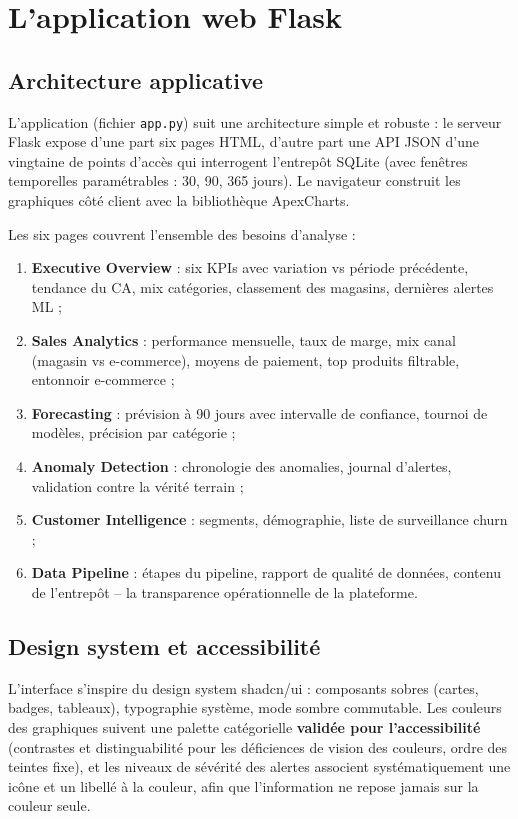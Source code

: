 \documentclass[12pt,a4paper]{report}
\begin{document}
\section{L'application web Flask}

\subsection{Architecture applicative}

L'application (fichier \texttt{app.py}) suit une architecture simple et
robuste : le serveur Flask expose d'une part six pages HTML, d'autre part une
API JSON d'une vingtaine de points d'accès qui interrogent l'entrepôt SQLite
(avec fenêtres temporelles paramétrables : 30, 90, 365 jours). Le navigateur
construit les graphiques côté client avec la bibliothèque ApexCharts.

Les six pages couvrent l'ensemble des besoins d'analyse :
\begin{enumerate}
  \item \textbf{Executive Overview} : six KPIs avec variation vs période
    précédente, tendance du CA, mix catégories, classement des magasins,
    dernières alertes ML ;
  \item \textbf{Sales Analytics} : performance mensuelle, taux de marge, mix
    canal (magasin vs e-commerce), moyens de paiement, top produits filtrable,
    entonnoir e-commerce ;
  \item \textbf{Forecasting} : prévision à 90 jours avec intervalle de
    confiance, tournoi de modèles, précision par catégorie ;
  \item \textbf{Anomaly Detection} : chronologie des anomalies, journal
    d'alertes, validation contre la vérité terrain ;
  \item \textbf{Customer Intelligence} : segments, démographie, liste de
    surveillance churn ;
  \item \textbf{Data Pipeline} : étapes du pipeline, rapport de qualité de
    données, contenu de l'entrepôt -- la transparence opérationnelle de la
    plateforme.
\end{enumerate}

\subsection{Design system et accessibilité}

L'interface s'inspire du design system shadcn/ui : composants sobres (cartes,
badges, tableaux), typographie système, mode sombre commutable. Les couleurs
des graphiques suivent une palette catégorielle \textbf{validée pour
l'accessibilité} (contrastes et distinguabilité pour les déficiences de vision
des couleurs, ordre des teintes fixe), et les niveaux de sévérité des alertes
associent systématiquement une icône et un libellé à la couleur, afin que
l'information ne repose jamais sur la couleur seule.
\end{document}

